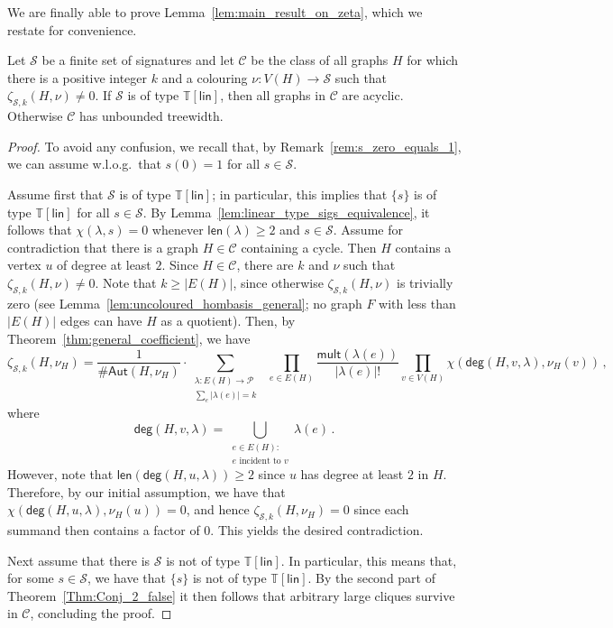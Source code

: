 \documentclass[authorcolumns,numberwithinsect]{no-lipics-v2022}
\begin{document}
We are finally able to prove Lemma~\ref{lem:main_result_on_zeta}, which we restate for convenience.
\begin{lemma}
    Let $\mathcal{S}$ be a finite set of signatures and let $\mathcal{C}$ be the class of all graphs $H$ for which there is a positive integer $k$ and a colouring $\nu:V(H)\to \mathcal{S}$ such that $\zeta_{\mathcal{S},k}(H,\nu)\neq 0$. If $\mathcal{S}$ is of type $\mathbb{T}[\mathsf{lin}]$, then all graphs in $\mathcal{C}$ are acyclic. Otherwise $\mathcal{C}$ has unbounded treewidth.
\end{lemma}
\begin{proof}
    To avoid any confusion, we recall that, by Remark~\ref{rem:s_zero_equals_1}, we can assume w.l.o.g.\ that $s(0)=1$ for all $s\in \mathcal{S}$. 

    Assume first that $\mathcal{S}$ is of type $\mathbb{T}[\mathsf{lin}]$; in particular, this implies that $\{s\}$ is of type $\mathbb{T}[\mathsf{lin}]$ for all $s\in \mathcal{S}$. By Lemma~\ref{lem:linear_type_sigs_equivalence}, it follows that $\chi(\lambda,s)=0$ whenever $\mathsf{len}(\lambda)\geq 2$ and $s\in \mathcal{S}$. Assume for contradiction that there is a graph $H \in \mathcal{C}$ containing a cycle. Then $H$ contains a vertex $u$ of degree at least $2$. Since $H\in \mathcal{C}$, there are $k$ and $\nu$ such that $\zeta_{\mathcal{S},k}(H,\nu)\neq 0$. Note that $k\geq |E(H)|$, since otherwise $\zeta_{\mathcal{S},k}(H,\nu)$ is trivially zero (see Lemma~\ref{lem:uncoloured_hombasis_general}; no graph $F$ with less than $|E(H)|$ edges can have $H$ as a quotient). Then, by Theorem~\ref{thm:general_coefficient}, we have 
    \[ \zeta_{\mathcal{S},k}(H,\nu_H)=\frac{1}{\#\mathsf{Aut}(H, \nu_H)} \cdot \sum_{\substack{\lambda: E(H) \to \mathcal{P}\\\sum_e |\lambda(e)| = k }}\ \  \prod_{e \in E(H)} \frac{\mathsf{mult}(\lambda(e))}{|\lambda(e)|!}  \prod_{v \in V(H)} \chi(\mathsf{deg}(H, v, \lambda), \nu_H(v))\,,\]
    where
    \[
\mathsf{deg}(H, v, \lambda) = \bigcup_{\substack{e \in E(H):\\ e \text{ incident to }v}} \lambda(e)\,. 
\]
However, note that $\mathsf{len}(\mathsf{deg}(H, u, \lambda))\geq 2$ since $u$ has degree at least $2$ in $H$. Therefore, by our initial assumption, we have that $\chi(\mathsf{deg}(H, u, \lambda), \nu_H(u))=0$, and hence $\zeta_{\mathcal{S},k}(H,\nu_H)=0$ since each summand then contains a factor of $0$. This yields the desired contradiction. 

Next assume that there is $\mathcal{S}$ is not of type $\mathbb{T}[\mathsf{lin}]$. In particular, this means that, for some $s\in \mathcal{S}$, we have that $\{s\}$ is not of type $\mathbb{T}[\mathsf{lin}]$. By the second part of Theorem~\ref{Thm:Conj_2_false} it then follows that arbitrary large cliques survive in $\mathcal{C}$, concluding the proof.
\end{proof}
\end{document}
